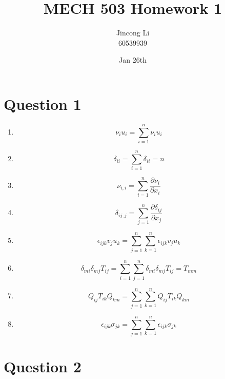 \documentclass[a4paper,12pt]{article} %
\begin{document}
\newcommand{\vect}[1]{\mathbf{#1}}

\title{MECH 503 Homework 1}
\author{Jincong Li \\ 60539939}
\date{Jan 26th}
\maketitle

\section{\textbf{Question 1}}

\begin{enumerate}[label= (\alph*)]
    \item \[ \nu_i u_i = \sum_{i=1}^{n} \nu_i u_i \]
    
    \item \[ \delta_{ii} = \sum_{i=1}^{n} \delta_{ii} = n \]

    \item \[ \nu_{i,i} = \sum_{i=1}^{n} \frac{\partial \nu_i}{\partial x_i} \]

    \item \[ \delta_{ij,j} = \sum_{j=1}^{n} \frac{\partial \delta_{ij}}{\partial x_j}\]

    \item \[ \epsilon_{ijk} v_j u_k = \sum_{j=1}^{n} \sum_{k=1}^{n} \epsilon_{ijk} v_j u_k \]

    \item \[ \delta_{mi} \delta_{mj} T_{ij} = \sum_{i=1}^{n} \sum_{j=1}^{n} \delta_{mi} \delta_{mj} T_{ij} = T_{mm} \]

    \item \[ Q_{ij} T_{ik} Q_{km} = \sum_{j=1}^{n} \sum_{k=1}^{n} Q_{ij} T_{ik} Q_{km} \]

    \item \[ \epsilon_{ijk} \sigma_{jk} = \sum_{j=1}^{n} \sum_{k=1}^{n} \epsilon_{ijk} \sigma_{jk} \]
\end{enumerate}

\section{\textbf{Question 2}}
\end{document}
